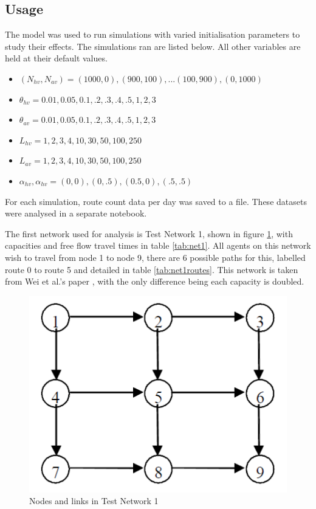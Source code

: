 \documentclass[12pt, a4paper, onecolumn]{article}
\begin{document}
\subsection{Usage}
The model was used to run simulations with varied initialisation parameters to study their effects. The simulations ran are listed below. All other variables are held at their default values.

\begin{itemize}
	\item $(N_{hv}, N_{av}) = (1000,0), (900,100), ... (100, 900), (0, 1000)$ 
	\item $\theta_{hv} = 0.01, 0.05, 0.1, .2, .3, .4, .5, 1, 2, 3$ 
	\item $\theta_{av} = 0.01, 0.05, 0.1, .2, .3, .4, .5, 1, 2, 3$
	\item $ L_{hv} = 1, 2, 3, 4 , 10, 30, 50, 100, 250$
	\item $ L_{av} = 1, 2, 3, 4 , 10, 30, 50, 100, 250$
	\item $ \alpha_{hv},\alpha_{hv} = (0,0) , (0,.5) ,(0.5,0), (.5,.5) $
	\end{itemize}

For each simulation, route count data per day was saved to a file. These datasets were analysed in a separate notebook.

The first network used for analysis is Test Network 1, shown in figure \ref{fig:net1}, with capacities and free flow travel times in table \ref{tab:net1}. All agents on this network wish to travel from node 1 to node 9, there are 6 possible paths for this, labelled route 0 to route 5 and detailed in table \ref{tab:net1routes}. This network is taken from Wei et al.'s paper \cite{Wei2014}, with the only difference being each capacity is doubled.

\newpage
\begin{figure}[h!]
	\centering
	\includegraphics[scale=.75]{net1.png}
	\caption{Nodes and links in Test Network 1}
	\label{fig:net1}
	\end{figure}
\end{document}
